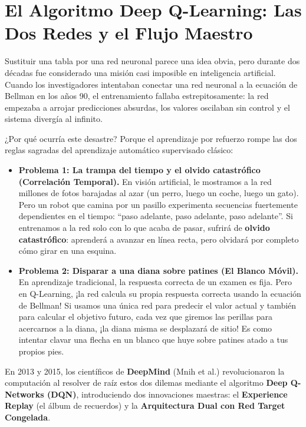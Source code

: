 \section{El Algoritmo Deep Q-Learning: Las Dos Redes y el Flujo Maestro}
Sustituir una tabla por una red neuronal parece una idea obvia, pero durante dos décadas fue considerado una misión casi imposible en inteligencia artificial. Cuando los investigadores intentaban conectar una red neuronal a la ecuación de Bellman en los años 90, el entrenamiento fallaba estrepitosamente: la red empezaba a arrojar predicciones absurdas, los valores oscilaban sin control y el sistema divergía al infinito.

¿Por qué ocurría este desastre? Porque el aprendizaje por refuerzo rompe las dos reglas sagradas del aprendizaje automático supervisado clásico:

\begin{itemize}
  \item \textbf{Problema 1: La trampa del tiempo y el olvido catastrófico (Correlación Temporal).} En visión artificial, le mostramos a la red millones de fotos barajadas al azar (un perro, luego un coche, luego un gato). Pero un robot que camina por un pasillo experimenta secuencias fuertemente dependientes en el tiempo: ``paso adelante, paso adelante, paso adelante''. Si entrenamos a la red solo con lo que acaba de pasar, sufrirá de \textbf{olvido catastrófico}: aprenderá a avanzar en línea recta, pero olvidará por completo cómo girar en una esquina.
  \item \textbf{Problema 2: Disparar a una diana sobre patines (El Blanco Móvil).} En aprendizaje tradicional, la respuesta correcta de un examen es fija. Pero en Q-Learning, ¡la red calcula su propia respuesta correcta usando la ecuación de Bellman! Si usamos una única red para predecir el valor actual y también para calcular el objetivo futuro, cada vez que giremos las perillas para acercarnos a la diana, ¡la diana misma se desplazará de sitio! Es como intentar clavar una flecha en un blanco que huye sobre patines atado a tus propios pies.
\end{itemize}

En 2013 y 2015, los científicos de \textbf{DeepMind} (Mnih et al.) revolucionaron la computación al resolver de raíz estos dos dilemas mediante el algoritmo \textbf{Deep Q-Networks (DQN)}, introduciendo dos innovaciones maestras: el \textbf{Experience Replay} (el álbum de recuerdos) y la \textbf{Arquitectura Dual con Red Target Congelada}.

